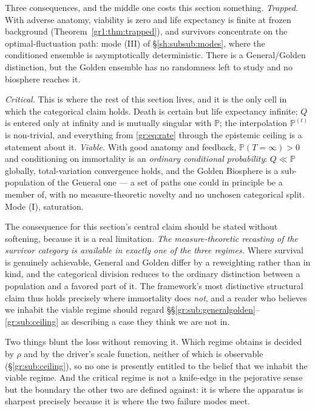 \documentclass[11pt]{article}
\numberwithin{equation}{section}
\theoremstyle{plain}
\theoremstyle{definition}
\theoremstyle{remark}
\newcommand{\PP}{\mathbb{P}}
\begin{document}
Three consequences, and the middle one costs this section something. \emph{Trapped.} With adverse anatomy, viability is zero and life
expectancy is finite at frozen background
(Theorem~\ref{gr1:thm:trapped}), and survivors concentrate on the
optimal-fluctuation path: mode (III) of \S\ref{sh:subsub:modes}, where
the conditioned ensemble is asymptotically deterministic. There is a
General/Golden distinction, but the Golden ensemble has no randomness
left to study and no biosphere reaches it.

\emph{Critical.} This is where the rest of this section lives, and it is
the only cell in which the categorical claim holds. Death is certain but
life expectancy infinite; $Q$ is entered only at infinity and is
mutually singular with $\PP$; the interpolation $\PP^{(t)}$ is
non-trivial, and everything from \eqref{gr:eq:rate} through the
epistemic ceiling is a statement about it. \emph{Viable.} With good anatomy and feedback, $\PP(T=\infty)>0$ and
conditioning on immortality is an \emph{ordinary conditional
probability}: $Q\ll\PP$ globally, total-variation convergence holds, and
the Golden Biosphere is a sub-population of the General one --- a set of
paths one could in principle be a member of, with no measure-theoretic
novelty and no unchosen categorical split. Mode (I), saturation.

The consequence for this section's central claim should be stated
without softening, because it is a real limitation. \emph{The
measure-theoretic recasting of the survivor category is available in
exactly one of the three regimes.} Where survival is genuinely
achievable, General and Golden differ by a reweighting rather than in
kind, and the categorical division reduces to the ordinary distinction
between a population and a favored part of it. The framework's most
distinctive structural claim thus holds precisely where immortality does
\emph{not}, and a reader who believes we inhabit the viable regime
should regard \S\S\ref{gr:sub:generalgolden}--\ref{gr:sub:ceiling} as
describing a case they think we are not in.

Two things blunt the loss without removing it. Which regime obtains is
decided by $\rho$ and by the driver's scale function, neither of which
is observable (\S\ref{gr:sub:ceiling}), so no one is presently entitled
to the belief that we inhabit the viable regime. And the critical regime
is not a knife-edge in the pejorative sense but the boundary the other
two are defined against: it is where the apparatus is sharpest precisely
because it is where the two failure modes meet.
\end{document}
